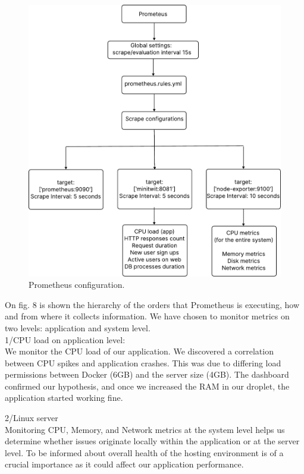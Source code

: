 \documentclass{article}
\begin{document}
\begin{figure}[ht]
    \centering
    \includegraphics[width=1.0\textwidth]{./pdfs/prometheus_configuration.pdf} 
    \caption{Prometheus configuration.}
    \label{fig:Prometheus configuration}
\end{figure}

On fig. 8 is shown the hierarchy of the orders that Prometheus is executing, how and from where it collects information. We have chosen to monitor metrics on two levels: application and system level.
\\
1/CPU load on application level:
\\We monitor the CPU load of our application. We discovered a correlation between CPU spikes and application crashes. This was due to differing load permissions between Docker (6GB) and the server size (4GB). The dashboard confirmed our hypothesis, and once we increased the RAM in our droplet, the application started working fine.

2/Linux server 
\\Monitoring CPU, Memory, and Network metrics at the system level helps us determine whether issues originate locally within the application or at the server level. To be informed about overall health of the hosting environment is of a crucial importance as it could affect our application performance.
\end{document}
